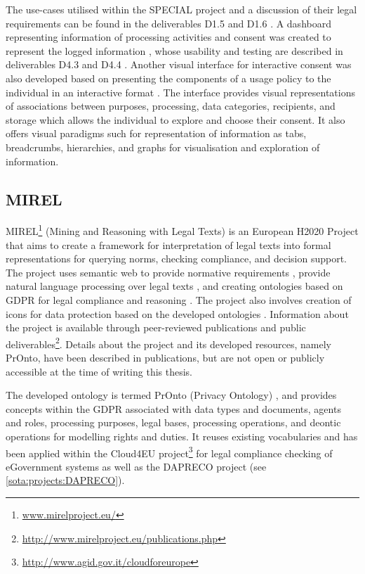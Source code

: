 The use-cases utilised within the SPECIAL project and a discussion of their legal requirements can be found in the deliverables D1.5 \cite{bonatti_d1.5_2018} and D1.6 \cite{schlehahn_d1.6_2018}. A dashboard representing information of processing activities and consent was created to represent the logged information \cite{raschke_designing_2017}, whose usability and testing are described in deliverables D4.3 \cite{raschke_d4.3_nodate} and D4.4 \cite{milosevic_d4.4_2019}. Another visual interface for interactive consent was also developed based on presenting the components of a usage policy to the individual in an interactive format \cite{gritzalis_i_2019}. The interface provides visual representations of associations between purposes, processing, data categories, recipients, and storage which allows the individual to explore and choose their consent. It also offers visual paradigms such for representation of information as tabs, breadcrumbs, hierarchies, and graphs for visualisation and exploration of information. 

\subsection{MIREL}\label{sota:projects:MIREL}
MIREL\footnote{\url{www.mirelproject.eu/}} (Mining and Reasoning with Legal Texts) is an European H2020 Project that aims to create a framework for interpretation of legal texts into formal representations for querying norms, checking compliance, and decision support. The project uses semantic web to provide normative requirements \cite{gandon_normative_2017}, provide natural language processing over legal texts \cite{milagro_teruel_legal_2018}, and creating ontologies based on GDPR \cite{monica_legal_2018} for legal compliance \cite{palmirani_pronto:_2018-1} and reasoning \cite{palmirani_pronto:_2018}. The project also involves creation of icons for data protection based on the developed ontologies \cite{arianna_dapis:_2019}.
Information about the project is available through peer-reviewed publications and public deliverables\footnote{\url{http://www.mirelproject.eu/publications.php}}.
Details about the project and its developed resources, namely PrOnto, have  been described in publications, but are not open or publicly accessible at the time of writing this thesis.

The developed ontology is termed PrOnto (Privacy Ontology) \cite{monica_legal_2018}, and provides concepts within the GDPR associated with data types and documents, agents and roles, processing purposes, legal bases, processing operations, and deontic operations for modelling rights and duties. It reuses existing vocabularies \cite{palmirani_pronto:_2018} and has been applied within the Cloud4EU project\footnote{\url{http://www.agid.gov.it/cloudforeurope}} for legal compliance checking of eGovernment systems as well as the DAPRECO project (see \autoref{sota:projects:DAPRECO}).

